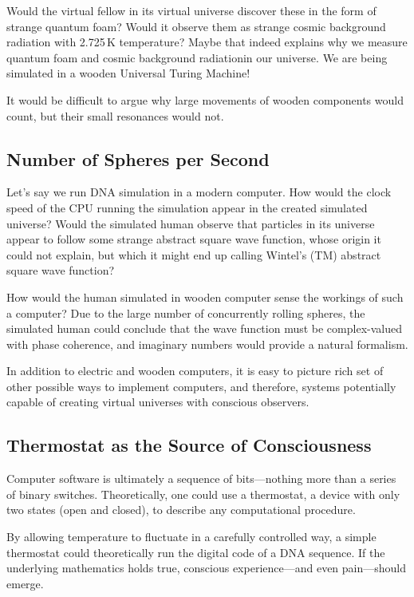 Would the virtual fellow in its virtual universe discover these in the form of strange quantum foam? Would it observe them as strange cosmic background radiation with 2.725\,K temperature? Maybe that 
indeed explains why we measure quantum foam and cosmic background radiationin our universe. We are being simulated in a wooden Universal Turing Machine!

It would be difficult to argue why large movements of wooden components would count, but their small resonances would not.

\subsection*{Number of Spheres per Second}

Let's say we run DNA simulation in a modern computer. How would the clock speed of the CPU running the simulation appear in the created simulated universe?
Would the simulated human observe that particles in its universe appear to follow some strange abstract square wave function, whose origin it could not explain, but which it might end up calling Wintel's (TM) abstract square wave function?

How would the human simulated in wooden computer sense the workings of such a computer? Due to the large number of concurrently rolling spheres,
the simulated human could conclude that the wave function must be complex-valued with phase coherence,
and imaginary numbers would provide a natural formalism.

In addition to electric and wooden computers, it is easy to picture rich set of other possible ways to implement computers, and therefore,
systems potentially capable of creating virtual universes with conscious observers.


\subsection*{Thermostat as the Source of Consciousness}

Computer software is ultimately a sequence of bits—nothing more than a series of binary switches. Theoretically, one could use a thermostat, a device with only two states (open and closed), to describe any computational procedure.

By allowing temperature to fluctuate in a carefully controlled way, a simple thermostat could theoretically run the digital code of a DNA sequence. If the underlying mathematics holds true, conscious experience—and even pain—should emerge.

